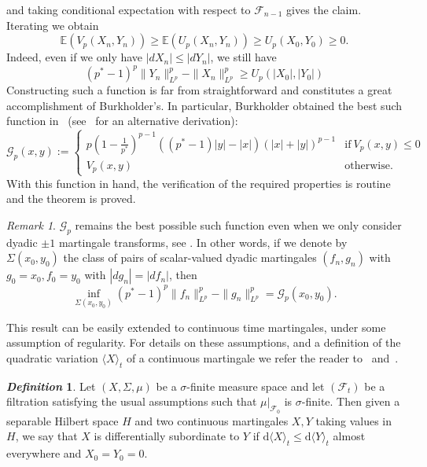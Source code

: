 \documentclass[11pt, a4paper]{amsart}
\theoremstyle{definition}
\newtheorem{definition}{\textsl{Definition}}
\theoremstyle{remark}
\newtheorem{remark}{Remark}
\begin{document}
and taking conditional expectation with respect to
$\mathcal F_{n-1}$ gives the claim.
Iterating we obtain
\begin{equation*}
    \mathbb E(V_p(X_n,Y_n))
    \ge \mathbb E(U_p(X_n,Y_n))
    \ge U_p(X_0,Y_0)\ge 0.
\end{equation*}
Indeed, even if we only have $|dX_n|\le |dY_n|$, we 
still have
\begin{equation}
    \label{eq:genburk}
    (p^*-1)^p\|Y_n\|_{L^p}^p-\|X_n\|_{L^p}^p\ge U_p(|X_0|,|Y_0|)
\end{equation}
Constructing such a function is far from straightforward 
and constitutes a great accomplishment of Burkholder's.
In particular, Burkholder obtained the best
such function in~\cite{Burkholder1988Sharp}
(see~\cite{VasVol} for an alternative derivation):
\begin{equation}
    \label{eq:burkfunct}
    \mathcal G_p(x,y):=\begin{cases}p\left(1-\frac1{p^*}\right)^{p-1}
    ((p^*-1)|y|-|x|)(|x|+|y|)^{p-1}&\mathrm{if\ }V_p(x,y)\le 0\\
    V_p(x,y)&\mathrm{otherwise.}
    \end{cases}
\end{equation}
With this function in hand, the verification
of the required properties is routine
and the theorem is proved.
\begin{remark}
$\mathcal G_p$ remains the best possible such 
function even when we only consider dyadic $\pm1$
martingale transforms, see \cite{VasVol}. In
other words, if we denote by $\Sigma(x_0,y_0)$
the class of pairs of scalar-valued
dyadic martingales $(f_n,g_n)$
with $g_0=x_0,f_0=y_0$ with $|dg_n|=|df_n|$, then
\begin{equation}
    \inf_{\Sigma(x_0,y_0)}(p^*-1)^p\|f_n\|_{L^p}^p
    -\|g_n\|_{L^p}^p=\mathcal G_p(x_0,y_0).
\label{eq:maxdyad}
\end{equation}
\end{remark}
This result can be easily extended to
continuous time martingales,
under some assumption of regularity.
For details on these assumptions, and 
a definition of the quadratic variation
$\langle X\rangle_t$ of a continuous 
martingale
we refer the reader to~\cite[Chapter 1]{Shreve}
and~\cite[Chapter IV]{revuzyor1999}.
\begin{definition}
Let $(X,\Sigma, \mu)$ be a $\sigma$-finite measure space
and let $(\mathcal F_t)$ be a filtration
satisfying the usual assumptions such that $\mu|_{\mathcal F_0}$
is $\sigma$-finite. Then given a separable Hilbert space $H$
and two continuous martingales
$X,Y$ taking values in $H$,
we say that $X$ is differentially subordinate
to $Y$ if
$\mathrm d\langle X\rangle_t\le
\mathrm d\langle Y\rangle_t$ almost everywhere
and $X_0=Y_0=0$.
\end{definition}
\end{document}

